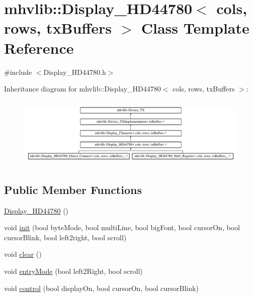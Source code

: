 \hypertarget{classmhvlib_1_1_display___h_d44780}{\section{mhvlib\-:\-:Display\-\_\-\-H\-D44780$<$ cols, rows, tx\-Buffers $>$ Class Template Reference}
\label{classmhvlib_1_1_display___h_d44780}
}


{\ttfamily \#include $<$Display\-\_\-\-H\-D44780.\-h$>$}

Inheritance diagram for mhvlib\-:\-:Display\-\_\-\-H\-D44780$<$ cols, rows, tx\-Buffers $>$\-:\begin{figure}[H]
\begin{center}
\leavevmode
\includegraphics[height=3.389831cm]{classmhvlib_1_1_display___h_d44780}
\end{center}
\end{figure}
\subsection*{Public Member Functions}
\begin{DoxyCompactItemize}
\item 
\hyperlink{classmhvlib_1_1_display___h_d44780_ae106f7cbe9ce5b29c306bc09c4d63f79}{Display\-\_\-\-H\-D44780} ()
\item 
void \hyperlink{classmhvlib_1_1_display___h_d44780_a6674c87aee34f849ea5c4d4b11543997}{init} (bool byte\-Mode, bool multi\-Line, bool big\-Font, bool cursor\-On, bool cursor\-Blink, bool left2right, bool scroll)
\item 
void \hyperlink{classmhvlib_1_1_display___h_d44780_ad4f7fb68e6c7d57bd5705dd8780ce7ca}{clear} ()
\item 
void \hyperlink{classmhvlib_1_1_display___h_d44780_ac44003d5e1c6f9b8b9a2c9631e851ab5}{entry\-Mode} (bool left2\-Right, bool scroll)
\item 
void \hyperlink{classmhvlib_1_1_display___h_d44780_a1d500b4291219f0e4430ea1cb2011ffe}{control} (bool display\-On, bool cursor\-On, bool cursor\-Blink)
\end{DoxyCompactItemize}
